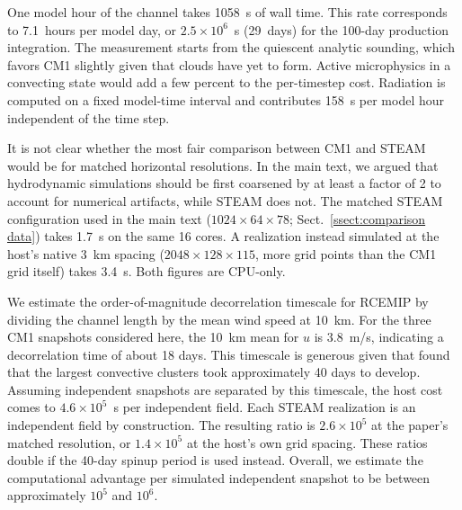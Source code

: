 \documentclass{article}
\begin{document}
One model hour of the channel takes 1058~s of wall time. This rate
corresponds to 7.1~hours per model day, or $2.5\times 10^{6}$~s
(29~days) for the 100-day production integration. The measurement
starts from the quiescent analytic sounding, which favors CM1
slightly given that clouds have yet to form. 
Active microphysics in a convecting state would add a few
percent to the per-timestep cost. Radiation is computed on a fixed model-time interval and contributes
158~s per model hour independent of the time step.

It is not clear whether the most fair comparison between CM1 and STEAM would
be for matched horizontal resolutions. In the main text, we argued that hydrodynamic
simulations should be first coarsened by at least a factor of 2 to account for 
numerical artifacts, while STEAM does not. The matched STEAM configuration
used in the main text ($1024 \times 64 \times 78$; Sect.~\ref{ssect:comparison data})
takes 1.7~s on the same 16 cores. A realization instead simulated at the host's native
3~km spacing ($2048 \times 128 \times 115$, more grid points than the
CM1 grid itself) takes 3.4~s. Both figures are CPU-only. 

We estimate the order-of-magnitude decorrelation timescale for RCEMIP by dividing the channel length by the mean wind speed at 10~km.
For the three CM1 snapshots considered here, the 10~km mean for $u$ is $3.8$~m/s, indicating a decorrelation time of about 18 days. This timescale is generous given that \citet{wing2018} found that the largest convective clusters took approximately 40 days to develop.
Assuming independent snapshots are separated by this timescale,
the host cost comes to $4.6\times
10^{5}$~s per independent field. Each STEAM realization is an independent field
by construction. The resulting ratio is $2.6\times 10^{5}$ at the
paper's matched resolution, or $1.4\times 10^{5}$ at the host's own
grid spacing. These ratios double if the 40-day spinup period is used instead.
Overall, we estimate the computational advantage per simulated independent snapshot to be between approximately
$10^5$ and $10^6$.



\end{document}
